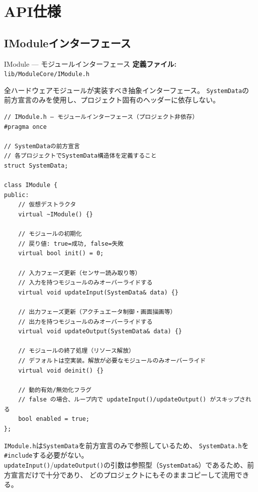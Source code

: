 \section{API仕様}\label{sec:api}

\subsection{IModuleインターフェース}

\begin{apibox}{IModule — モジュールインターフェース}
\textbf{定義ファイル:} \texttt{lib/ModuleCore/IModule.h}

全ハードウェアモジュールが実装すべき抽象インターフェース。
\texttt{SystemData}の前方宣言のみを使用し、プロジェクト固有のヘッダーに依存しない。
\end{apibox}

\begin{lstlisting}[style=cppstyle, caption={IModuleインターフェース定義}]
// IModule.h — モジュールインターフェース（プロジェクト非依存）
#pragma once

// SystemDataの前方宣言
// 各プロジェクトでSystemData構造体を定義すること
struct SystemData;

class IModule {
public:
    // 仮想デストラクタ
    virtual ~IModule() {}

    // モジュールの初期化
    // 戻り値: true=成功, false=失敗
    virtual bool init() = 0;

    // 入力フェーズ更新（センサー読み取り等）
    // 入力を持つモジュールのみオーバーライドする
    virtual void updateInput(SystemData& data) {}

    // 出力フェーズ更新（アクチュエータ制御・画面描画等）
    // 出力を持つモジュールのみオーバーライドする
    virtual void updateOutput(SystemData& data) {}

    // モジュールの終了処理（リソース解放）
    // デフォルトは空実装。解放が必要なモジュールのみオーバーライド
    virtual void deinit() {}

    // 動的有効/無効化フラグ
    // false の場合、ループ内で updateInput()/updateOutput() がスキップされる
    bool enabled = true;
};
\end{lstlisting}

\begin{notebox}[前方宣言によるプロジェクト非依存性]
\texttt{IModule.h}は\texttt{SystemData}を前方宣言のみで参照しているため、
\texttt{SystemData.h}を\texttt{\#include}する必要がない。\\
\texttt{updateInput()}/\texttt{updateOutput()}の引数は参照型（\texttt{SystemData\&}）であるため、前方宣言だけで十分であり、
どのプロジェクトにもそのままコピーして流用できる。
\end{notebox}

